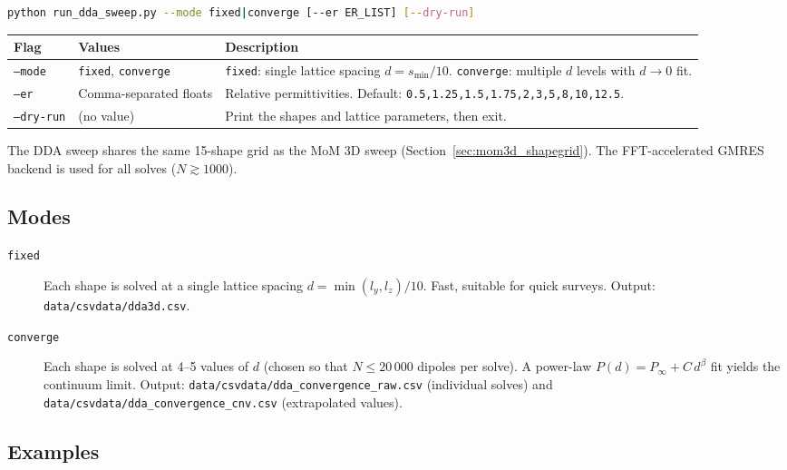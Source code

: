 \documentclass[a4paper,11pt]{article}
\begin{document}
\begin{lstlisting}[language=bash]
python run_dda_sweep.py --mode fixed|converge [--er ER_LIST] [--dry-run]
\end{lstlisting}

\begin{center}
\begin{tabular}{@{}llp{5.5cm}@{}}
\toprule
Flag & Values & Description \\
\midrule
\texttt{--mode} & \texttt{fixed}, \texttt{converge}
    & \texttt{fixed}: single lattice spacing $d = s_{\min}/10$.
      \texttt{converge}: multiple $d$ levels with $d \to 0$ fit. \\
\texttt{--er} & Comma-separated floats
    & Relative permittivities.
      Default: \texttt{0.5,1.25,1.5,1.75,2,3,5,8,10,12.5}. \\
\texttt{--dry-run} & (no value)
    & Print the shapes and lattice parameters, then exit. \\
\bottomrule
\end{tabular}
\end{center}

The DDA sweep shares the same 15-shape grid as the MoM 3D sweep
(Section~\ref{sec:mom3d_shapegrid}).  The FFT-accelerated GMRES backend is
used for all solves ($N \gtrsim 1000$).

\subsection{Modes}

\begin{description}
    \item[\texttt{fixed}] Each shape is solved at a single lattice spacing
        $d = \min(l_y, l_z) / 10$.  Fast, suitable for quick surveys.
        Output: \texttt{data/csvdata/dda3d.csv}.

    \item[\texttt{converge}] Each shape is solved at 4--5 values of $d$
        (chosen so that $N \le 20\,000$ dipoles per solve).  A power-law
        $P(d) = P_\infty + C\, d^\beta$ fit yields the continuum limit.
        Output:
        \texttt{data/csvdata/dda\_convergence\_raw.csv} (individual solves) and
        \texttt{data/csvdata/dda\_convergence\_cnv.csv} (extrapolated values).
\end{description}

\subsection{Examples}
\end{document}
